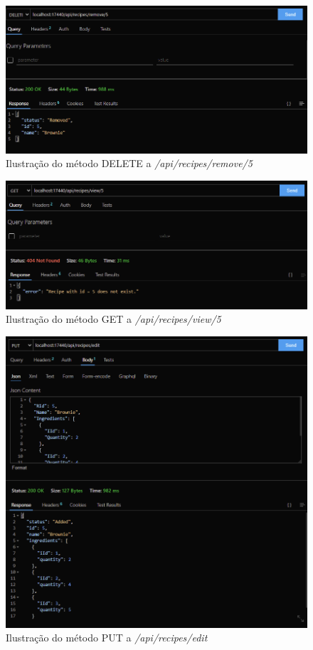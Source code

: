 \FloatBarrier
\begin{figure}[!hbt]
    \centering
    \includegraphics[width=14cm]{Resources/API/Recipes/Recipes (3).png}
    \caption{Ilustração do método DELETE a \textit{/api/recipes/remove/5}}
    \label{fig:api_rec_3}
\end{figure}
\FloatBarrier
\begin{figure}[!hbt]
    \centering
    \includegraphics[width=14cm]{Resources/API/Recipes/Recipes (4).png}
    \caption{Ilustração do método GET a \textit{/api/recipes/view/5}}
    \label{fig:api_rec_4}
\end{figure}
\FloatBarrier
\begin{figure}[!hbt]
    \centering
    \includegraphics[width=14cm]{Resources/API/Recipes/Recipes (5).png}
    \caption{Ilustração do método PUT a \textit{/api/recipes/edit}}
    \label{fig:api_rec_5}
\end{figure}
